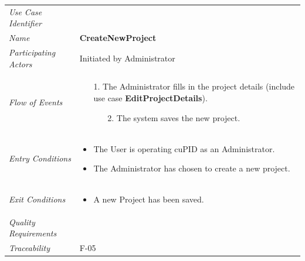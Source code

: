 \documentclass[12pt,letterpaper]{article}
\begin{document}
\begin{center}
	\begin{tabu} to 
		\toprule
		Use Case Identifier & \createnewproject{} \\
		Name & {\bf CreateNewProject} \\
		Participating Actors & Initiated by Administrator \\
		Flow of Events & 
		\begin{minipage}[t]{\linewidth}
		    \begin{enumerate}
			    \item[1.] The Administrator fills in the project details (include use case \textbf{EditProjectDetails}).
			    \begin{enumerate}
			        \item[2.] The system saves the new project.
			    \end{enumerate}
			\end{enumerate}
	    \end{minipage} \\

		Entry Conditions &
		\begin{minipage}[t]{\linewidth}
			\begin{itemize}
			    \item The User is operating cuPID as an Administrator.
			    \item The Administrator has chosen to create a new project.
	        \end{itemize}
	    \end{minipage} \\

		Exit Conditions &
		\begin{minipage}[t]{\linewidth}
			\begin{itemize}
			    \item A new Project has been saved.
	        \end{itemize}
	    \end{minipage} \\

		Quality Requirements & \\

		Traceability & F-05 \\
		\toprule
	\end{tabu}
\end{center}
\end{document}
